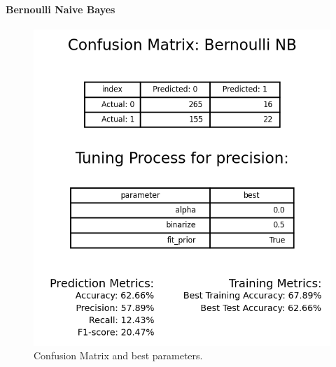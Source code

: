             \paragraph{Bernoulli Naive Bayes}
                \begin{figure}[H]
                        \centering
                        \includegraphics[scale=1]{images/dm_confu_mat_bern_nb}
                        \caption{Confusion Matrix and best parameters.}
                        \label{fig:dm-bernoulli-nb}
                \end{figure}
